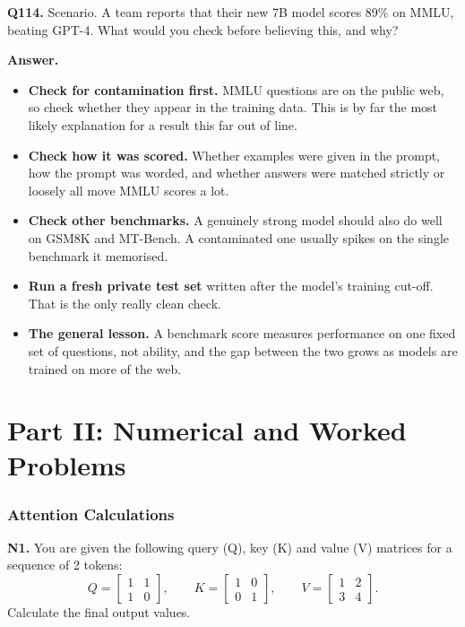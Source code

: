 \documentclass[11pt]{article}
\begin{document}
\medskip
\textbf{Q114.} Scenario. A team reports that their new 7B model scores 89\% on MMLU, beating
GPT-4. What would you check before believing this, and why?

\textbf{Answer.}
\begin{itemize}
  \item \textbf{Check for contamination first.} MMLU questions are on the public web, so check whether they appear in the training data. This is by far the most likely explanation for a result this far out of line.
  \item \textbf{Check how it was scored.} Whether examples were given in the prompt, how the prompt was worded, and whether answers were matched strictly or loosely all move MMLU scores a lot.
  \item \textbf{Check other benchmarks.} A genuinely strong model should also do well on GSM8K and MT-Bench. A contaminated one usually spikes on the single benchmark it memorised.
  \item \textbf{Run a fresh private test set} written after the model's training cut-off. That is the only really clean check.
  \item \textbf{The general lesson.} A benchmark score measures performance on one fixed set of questions, not ability, and the gap between the two grows as models are trained on more of the web.
\end{itemize}

\newpage
\part*{Part II: Numerical and Worked Problems}

\section{Attention Calculations}

\textbf{N1.} You are given the following query (Q), key (K) and value (V) matrices for a
sequence of 2 tokens:
\[
Q=\begin{bmatrix}1 & 1\\ 1 & 0\end{bmatrix},\qquad
K=\begin{bmatrix}1 & 0\\ 0 & 1\end{bmatrix},\qquad
V=\begin{bmatrix}1 & 2\\ 3 & 4\end{bmatrix}.
\]
Calculate the final output values.
\end{document}
